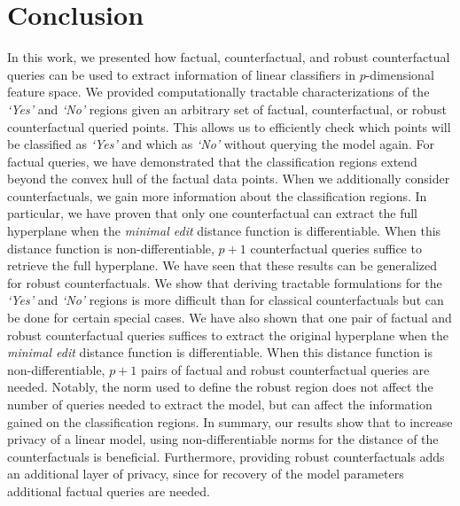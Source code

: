 \documentclass{article}
\begin{document}
{\section{Conclusion}
In this work, we presented how factual, counterfactual, and robust counterfactual queries can be used to extract information of linear classifiers in $p$-dimensional feature space. We provided computationally tractable characterizations of the \textit{`Yes'} and \textit{`No'} regions given an arbitrary set of factual, counterfactual, or robust counterfactual queried points. This allows us to efficiently check which points will be classified as \textit{`Yes'} and which as \textit{`No'} without querying the model again. For factual queries, we have demonstrated that the classification regions extend beyond the convex hull of the factual data points. When we additionally consider counterfactuals, we gain more information about the classification regions. In particular, we have proven that only one counterfactual can extract the full hyperplane when the \textit{minimal edit} distance function is differentiable. When this distance function is non-differentiable, $p+1$ counterfactual queries suffice to retrieve the full hyperplane. We have seen that these results can be generalized for robust counterfactuals. We show that deriving tractable formulations for the \textit{`Yes'} and \textit{`No'} regions is more difficult than for classical counterfactuals but can be done for certain special cases. We have also shown that one pair of factual and robust counterfactual queries suffices to extract the original hyperplane when the \textit{minimal edit} distance function is differentiable. When this distance function is non-differentiable, $p+1$ pairs of factual and robust counterfactual queries are needed. Notably, the norm used to define the robust region does not affect the number of queries needed to extract the model, but can affect the information gained on the classification regions. In summary, our results show that to increase privacy of a linear model, using non-differentiable norms for the distance of the counterfactuals is beneficial. Furthermore, providing robust counterfactuals adds an additional layer of privacy, since for recovery of the model parameters additional factual queries are needed.

}
\end{document}
